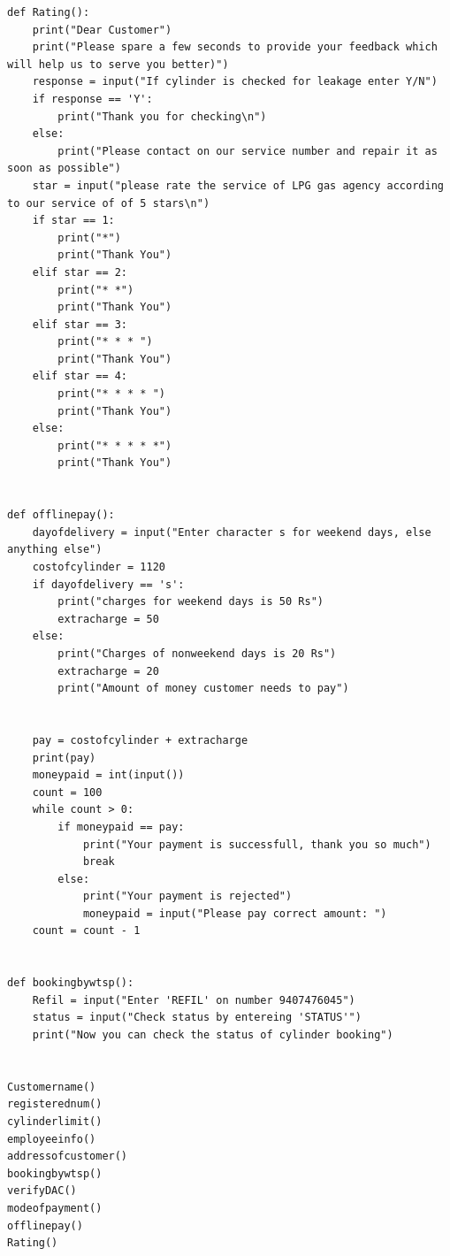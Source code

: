 \documentclass{article}
\begin{document}
{\begin{lstlisting}
def Rating():
    print("Dear Customer")
    print("Please spare a few seconds to provide your feedback which will help us to serve you better)")
    response = input("If cylinder is checked for leakage enter Y/N")
    if response == 'Y':
        print("Thank you for checking\n")
    else:
        print("Please contact on our service number and repair it as soon as possible")
    star = input("please rate the service of LPG gas agency according to our service of of 5 stars\n")
    if star == 1:
        print("*")
        print("Thank You")
    elif star == 2:
        print("* *")
        print("Thank You")
    elif star == 3:
        print("* * * ")
        print("Thank You")
    elif star == 4:
        print("* * * * ")
        print("Thank You")
    else:
        print("* * * * *")
        print("Thank You")


def offlinepay():
    dayofdelivery = input("Enter character s for weekend days, else anything else")
    costofcylinder = 1120
    if dayofdelivery == 's':
        print("charges for weekend days is 50 Rs")
        extracharge = 50
    else:
        print("Charges of nonweekend days is 20 Rs")
        extracharge = 20
        print("Amount of money customer needs to pay")


    pay = costofcylinder + extracharge
    print(pay)
    moneypaid = int(input())
    count = 100
    while count > 0:
        if moneypaid == pay:
            print("Your payment is successfull, thank you so much")
            break
        else:
            print("Your payment is rejected")
            moneypaid = input("Please pay correct amount: ")
    count = count - 1


def bookingbywtsp():
    Refil = input("Enter 'REFIL' on number 9407476045")
    status = input("Check status by entereing 'STATUS'")
    print("Now you can check the status of cylinder booking")


Customername()
registerednum()
cylinderlimit()
employeeinfo()
addressofcustomer()
bookingbywtsp()
verifyDAC()
modeofpayment()
offlinepay()
Rating()
\end{lstlisting}
\\
\\
\\
}
\end{document}
